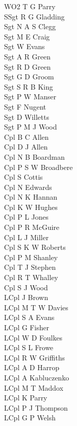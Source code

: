 \begin{multicols}{3}
  \small
  \noindent
  WO2 T G Parry \\
  SSgt R G Gladding \\
  Sgt N A S Clegg \\
  Sgt M E Craig \\
  Sgt W Evans \\
  Sgt A R Green \\
  Sgt R D Green \\
  Sgt G D Groom \\
  Sgt S R B King \\
  Sgt P W Manser \\
  Sgt F Nugent \\
  Sgt D Willetts \\
  Sgt P M J Wood \\
  Cpl B C Allen \\
  Cpl D J Allen \\
  Cpl N B Boardman \\
  Cpl P S W Broadbere \\
  Cpl S Cottis \\
  Cpl N Edwards \\
  Cpl N K Hannan \\
  Cpl K W Hughes \\
  Cpl P L Jones \\
  Cpl P R McGuire \\
  Cpl L J Miller \\
  Cpl S K W Roberts \\
  Cpl P M Shanley \\
  Cpl T J Stephen \\
  Cpl R T Whalley \\
  Cpl S J Wood \\
  LCpl J Brown \\
  LCpl M T W Davies \\
  LCpl S A Evans \\
  LCpl G Fisher \\
  LCpl W D Foulkes \\
  LCpl S L Frowe \\
  LCpl R W Griffiths \\
  LCpl A D Harrop \\
  LCpl A Kabluczenko \\
  LCpl M T Maddox \\
  LCpl K Parry \\
  LCpl P J Thompson \\
  LCpl G P Welsh \\

\end{multicols}
